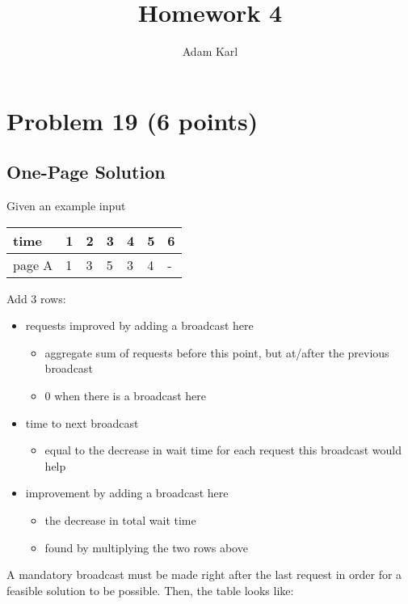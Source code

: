 \documentclass[a4paper]{article}
\title{Homework 4}
\author{Adam Karl}
\begin{document}
\maketitle

\section{Problem 19 (6 points)}
\subsection{One-Page Solution}

Given an example input

\begin{table}[htb]
\begin{tabular}{|l|l|l|l|l|l|l|}
\hline
time   & 1 & 2 & 3 & 4 & 5 & 6 \\ \hline
page A & 1 & 3 & 5 & 3 & 4 & - \\ \hline
\end{tabular}
\end{table}

Add 3 rows:
\begin{itemize}
    \item requests improved by adding a broadcast here
    \begin{itemize}
        \item aggregate sum of requests before this point, but at/after the previous broadcast
        \item 0 when there is a broadcast here
    \end{itemize}
    \item time to next broadcast
    \begin{itemize}
        \item equal to the decrease in wait time for each request this broadcast would help
    \end{itemize}
    \item improvement by adding a broadcast here
    \begin{itemize}
        \item the decrease in total wait time
        \item found by multiplying the two rows above
    \end{itemize}
    
\end{itemize}

A mandatory broadcast must be made right after the last request in order for a feasible solution to be possible. Then, the table looks like:
\end{document}
